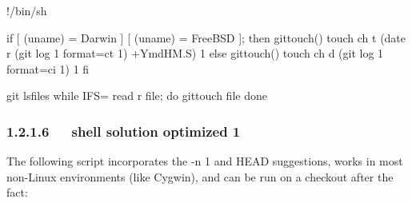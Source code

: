 \documentclass[letterpaper,12pt,english]{sphinxmanual}
\begin{document}
\begin{sphinxVerbatim}[commandchars=\\\{\}]
\PYGZsh{}!/bin/sh

if [ \PYGZdq{}\PYGZdl{}(uname)\PYGZdq{} = \PYGZsq{}Darwin\PYGZsq{} ] \textbar{}\textbar{}
   [ \PYGZdq{}\PYGZdl{}(uname)\PYGZdq{} = \PYGZsq{}FreeBSD\PYGZsq{} ]; then
   gittouch() \PYGZob{}
      touch \PYGZhy{}ch \PYGZhy{}t \PYGZdq{}\PYGZdl{}(date \PYGZhy{}r \PYGZdq{}\PYGZdl{}(git log \PYGZhy{}1 \PYGZhy{}\PYGZhy{}format=\PYGZpc{}ct \PYGZdq{}\PYGZdl{}1\PYGZdq{})\PYGZdq{}   \PYGZsq{}+\PYGZpc{}Y\PYGZpc{}m\PYGZpc{}d\PYGZpc{}H\PYGZpc{}M.\PYGZpc{}S\PYGZsq{})\PYGZdq{} \PYGZdq{}\PYGZdl{}1\PYGZdq{}
   \PYGZcb{}
else
   gittouch() \PYGZob{}
      touch \PYGZhy{}ch \PYGZhy{}d \PYGZdq{}\PYGZdl{}(git log \PYGZhy{}1 \PYGZhy{}\PYGZhy{}format=\PYGZpc{}ci \PYGZdq{}\PYGZdl{}1\PYGZdq{})\PYGZdq{} \PYGZdq{}\PYGZdl{}1\PYGZdq{}
   \PYGZcb{}
fi

git ls\PYGZhy{}files \textbar{}
   while IFS= read \PYGZhy{}r file; do
      gittouch \PYGZdq{}\PYGZdl{}file\PYGZdq{}
   done
\end{sphinxVerbatim}


\subsubsection{1.2.1.6   shell solution optimized 1}
\label{\detokenize{001software/001install/001._u7f51_u7ad9/github:id3}}
The following script incorporates the -n 1 and HEAD suggestions, works in most non-Linux environments (like Cygwin), and can be run on a checkout after the fact:
\end{document}
